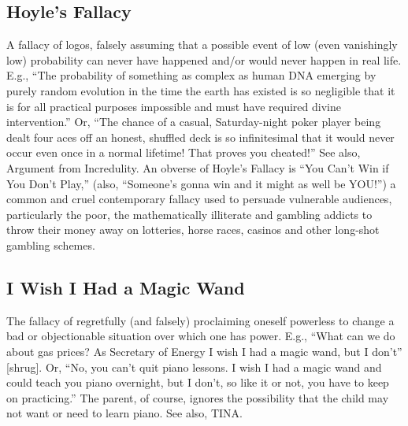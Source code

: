 \documentclass[10pt,a4paper,british]{article}
\begin{document}
\begin{multicols}{2}
	\subsection{Hoyle's Fallacy} A fallacy of logos, falsely assuming that a possible event of low (even vanishingly low) probability can never have happened and/or would never happen in real life. E.g., ``The probability of something as complex as human DNA emerging by purely random evolution in the time the earth has existed is so negligible that it is for all practical purposes impossible and must have required divine intervention.'' Or, ``The chance of a casual, Saturday{-}night poker player being dealt four aces off an honest, shuffled deck is so infinitesimal that it would never occur even once in a normal lifetime!  That proves you cheated!'' See also, Argument from Incredulity. An obverse of Hoyle's Fallacy is ``You Can't Win if You Don't Play,'' (also, ``Someone's gonna win and it might as well be YOU!'') a common and cruel contemporary fallacy used to persuade vulnerable audiences, particularly the poor, the mathematically illiterate and gambling addicts to throw their money away on lotteries, horse races, casinos and other long{-}shot gambling schemes.  

	\subsection{I Wish I Had a Magic Wand} The fallacy of regretfully (and falsely) proclaiming oneself powerless to change a bad or objectionable situation over which one has power. E.g., ``What can we do about gas prices? As Secretary of Energy I wish I had a magic wand, but I don't'' [shrug]. Or, ``No, you can't quit piano lessons. I wish I had a magic wand and could teach you piano overnight, but I don't, so like it or not, you have to keep on practicing.'' The parent, of course, ignores the possibility that the child may not want or need to learn piano. See also, TINA.  


\end{multicols}
\end{document}
